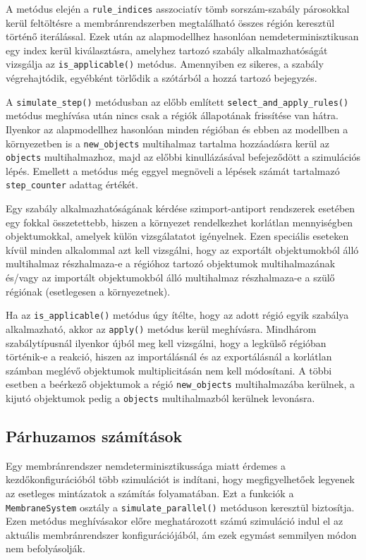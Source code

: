 A metódus elején a \verb|rule_indices| asszociatív tömb sorszám-szabály párosokkal kerül feltöltésre a membránrendszerben megtalálható összes régión keresztül történő iterálással. Ezek után az alapmodellhez hasonlóan nemdeterminisztikusan egy index kerül kiválasztásra, amelyhez tartozó szabály alkalmazhatóságát vizsgálja az \verb|is_applicable()| metódus. Amennyiben ez sikeres, a szabály végrehajtódik, egyébként törlődik a szótárból a hozzá tartozó bejegyzés.

A \verb|simulate_step()| metódusban az előbb említett \verb|select_and_apply_rules()| metódus meghívása után nincs csak a régiók állapotának frissítése van hátra. Ilyenkor az alapmodellhez hasonlóan minden régióban és ebben az modellben a környezetben is a \verb|new_objects| multihalmaz tartalma hozzáadásra kerül az \verb|objects| multihalmazhoz, majd az előbbi kinullázásával befejeződött a szimulációs lépés. Emellett a metódus még eggyel megnöveli a lépések számát tartalmazó \verb|step_counter| adattag értékét.

Egy szabály alkalmazhatóságának kérdése szimport-antiport rendszerek esetében egy fokkal összetettebb, hiszen a környezet rendelkezhet korlátlan mennyiségben objektumokkal, amelyek külön vizsgálatatot igényelnek. Ezen speciális eseteken kívül minden alkalommal azt kell vizsgálni, hogy az exportált objektumokból álló multihalmaz részhalmaza-e a régióhoz tartozó objektumok multihalmazának és/vagy az importált objektumokból álló multihalmaz részhalmaza-e a szülő régiónak (esetlegesen a környezetnek).

Ha az \verb|is_applicable()| metódus úgy ítélte, hogy az adott régió egyik szabálya alkalmazható, akkor az \verb|apply()| metódus kerül meghívásra. Mindhárom szabálytípusnál ilyenkor újból meg kell vizsgálni, hogy a legkülső régióban történik-e a reakció, hiszen az importálásnál és az exportálásnál a korlátlan számban meglévő objektumok multiplicitásán nem kell módosítani. A többi esetben a beérkező objektumok a régió \verb|new_objects| multihalmazába kerülnek, a kijutó objektumok pedig a \verb|objects| multihalmazból kerülnek levonásra.


\subsection{Párhuzamos számítások}

Egy membránrendszer nemdeterminisztikussága miatt érdemes a kezdőkonfigurációból több szimulációt is indítani, hogy megfigyelhetőek legyenek az esetleges mintázatok a számítás folyamatában. Ezt a funkciók a \verb|MembraneSystem| osztály a \verb|simulate_parallel()| metóduson keresztül biztosítja. Ezen metódus meghívásakor előre meghatározott számú szimuláció indul el az aktuális membránrendszer konfigurációjából, ám ezek egymást semmilyen módon nem befolyásolják.

